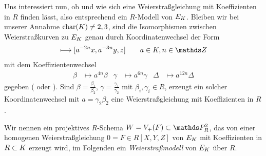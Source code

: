 \documentclass[german, bibliography=totoc]{scrreprt}
\begin{document}
Uns interessiert nun, ob und wie sich eine Weierstraßgleichung mit
Koeffizienten in $R$ finden lässt, also entsprechend ein $R$-Modell
von $E_{K}$.
Bleiben wir bei unserer Annahme $\operatorname{char}(K)\neq2,3$, sind die
Isomorphismen zwischen Weierstraßkurven zu $E_{K}$ genau durch
Koordinatenwechsel der Form
\begin{gather*}
  [x,y,z] \longmapsto [a^{-2n}x, a^{-3n}y, z] \qquad a\in\K, n\in\Z
\end{gather*}
mit dem Koeffizientenwechsel
\begin{align*}
  \beta&\mapsto a^{4n}\beta
  &\gamma&\mapsto a^{6n}\gamma
  &\Delta&\mapsto a^{12n}\Delta
\end{align*}
gegeben
(\cite[1.5, Lemma 2]{neron} oder \cite[Chapter VII.1]{silverman}).
Sind $\beta=\frac{\beta_1}{\beta_2}$,
$\gamma=\frac{\gamma_1}{\gamma_2}$ mit $\beta_i,\gamma_i\in R$,
erzeugt ein solcher Koordinatenwechsel mit $a=\gamma_2\beta_2$ eine
Weierstraßgleichung mit Koeffizienten in $R$.

\begin{Definition}[Weierstraßmodell]
  Wir nennen ein projektives $R$-Schema $W=V_+(F)\subset\P_R^2$, das
  von einer homogenen Weierstraßgleichung $0=F\in R[X,Y,Z]$ von $E_{K}$
  mit Koeffizienten in $R\subset K$ erzeugt wird, im Folgenden
  ein \emph{Weierstraßmodell} von $E_{K}$ über $R$.
\end{Definition}
\end{document}
